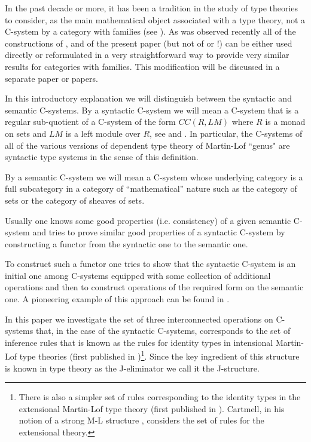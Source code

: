 \documentclass[12pt]{article}
\begin{document}
In the past decade or more, it has been a tradition in the study of type theories to consider, as the main mathematical object associated with a type theory, not a C-system by a category with families (see \cite{Dybjer}). As was observed recently all of the constructions of \cite{Cfromauniverse}, \cite{fromunivwithPi}  and of the present paper (but not of \cite{Csubsystems} or \cite{Cofamodule}!) can be either used directly or reformulated in a very straightforward way to provide very similar results for categories with families. This modification will be discussed in a separate paper or papers. 

In this introductory explanation we will distinguish between the syntactic and semantic C-systems. By a syntactic C-system we will mean a C-system that is a regular sub-quotient of a C-system of the form $CC(R,LM)$ where $R$ is a monad on sets and $LM$ is a left module over $R$, see \cite{Cofamodule} and \cite{Csubsystems}. In particular, the C-systems of all of the various versions of dependent type theory of Martin-Lof ``genus" are syntactic type systems in the sense of this definition. 

By a semantic C-system we will mean a C-system whose underlying category is a full subcategory in a category of ``mathematical'' nature such as the category of sets or the category of sheaves of sets. 

Usually one knows some good properties (i.e. consistency) of a given semantic C-system and tries to prove similar good properties of a syntactic C-system by constructing a functor from the syntactic one to the semantic one. 

To construct such a functor one tries to show that the syntactic C-system is an initial one among C-systems equipped with some collection of additional operations and then to construct operations of the required form on the semantic one. A pioneering example of this approach can be found in \cite{Streicher}.

In this paper we investigate the set of three interconnected operations on C-systems that, in the case of the syntactic C-systems, corresponds to the set of inference rules that is known as the rules for identity types in intensional Martin-Lof type theories (first published in \cite{MLTT73})\footnote{There is also a simpler set of rules corresponding to the identity types in the extensional Martin-Lof type theory (first published in \cite{MLTT79}). Cartmell, in his notion of a strong M-L structure \cite[p.3.36]{Cartmell0}, considers the set of rules for the extensional theory.}. Since the key ingredient of this structure is known in type theory as the J-eliminator we call it the J-structure. 
\end{document}

